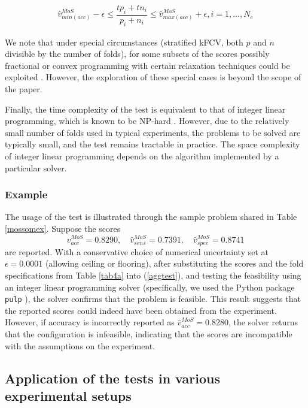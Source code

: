 \documentclass[3p, times]{elsarticle}
\begin{document}
\begin{align}
\hat{v}_{min(acc)}^{MoS} - \epsilon \leq \dfrac{tp_i + tn_i}{p_i + n_i} \leq \hat{v}_{max(acc)}^{MoS} + \epsilon, i = 1, \dots, N_e
\end{align}

We note that under special circumstances (stratified kFCV, both $p$ and $n$ divisible by the number of folds), for some subsets of the scores possibly fractional or convex programming with certain relaxation techniques could be exploited \cite{nonlinear}. However, the exploration of these special cases is beyond the scope of the paper.

Finally, the time complexity of the test is equivalent to that of integer linear programming, which is known to be NP-hard \cite{ip}. However, due to the relatively small number of folds used in typical experiments, the problems to be solved are typically small, and the test remains tractable in practice. The space complexity of integer linear programming depends on the algorithm implemented by a particular solver.

\subsubsection{Example}
\label{sec:mosex}

The usage of the test is illustrated through the sample problem shared in Table \ref{mossomex}. Suppose the scores
\begin{equation}
\hat{v}_{acc}^{MoS} = 0.8290, \quad
\hat{v}_{sens}^{MoS} = 0.7391, \quad
\hat{v}_{spec}^{MoS} = 0.8741
\end{equation}
are reported. With a conservative choice of numerical uncertainty set at $\epsilon=0.0001$ (allowing ceiling or flooring), after substituting the scores and the fold specifications from Table \ref{tab4a} into (\ref{aggtest}), and testing the feasibility using an integer linear programming solver (specifically, we used the Python package \verb|pulp| \cite{pulp}), the solver confirms that the problem is feasible. This result suggests that the reported scores could indeed have been obtained from the experiment. However, if accuracy is incorrectly reported as $\hat{v}_{acc}^{MoS} = 0.8280$, the solver returns that the configuration is infeasible, indicating that the scores are incompatible with the assumptions on the experiment.

\subsection{Application of the tests in various experimental setups}
\label{sec:mapping}
\end{document}
